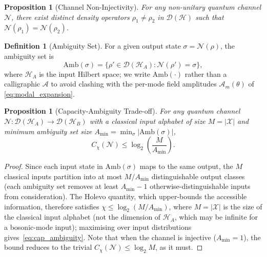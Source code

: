 \documentclass[journal,twocolumn]{IEEEtran}
\theoremstyle{definition}
\newtheorem{definition}{Definition}[section]
\theoremstyle{plain}
\newtheorem{proposition}[theorem]{Proposition}
\newcommand{\calH}{\mathcal{H}}
\newcommand{\Amb}{\mathrm{Amb}}
\begin{document}
\begin{proposition}[Channel Non-Injectivity]
\label{thm:non_inject}
For any non-unitary quantum channel $\mathcal{N}$, there exist
distinct density operators $\rho_1 \ne \rho_2$ in
$\mathcal{D}(\calH)$ such that $\mathcal{N}(\rho_1) =
\mathcal{N}(\rho_2)$.
\end{proposition}

\begin{definition}[Ambiguity Set]
For a given output state $\sigma = \mathcal{N}(\rho)$, the ambiguity
set is
\begin{equation}
  \Amb(\sigma) = \bigl\{\rho' \in \mathcal{D}(\calH_A)
    : \mathcal{N}(\rho') = \sigma\bigr\},
  \label{eq:ambiguity_set}
\end{equation}
where $\calH_A$ is the input Hilbert space; we write $\Amb(\cdot)$
rather than a calligraphic $\mathcal{A}$ to avoid clashing with the
per-mode field amplitudes $\mathcal{A}_m(\theta)$ of
\eqref{eq:modal_expansion}.
\end{definition}

\begin{proposition}[Capacity-Ambiguity Trade-off]
\label{thm:cap_ambiguity}
For any quantum channel $\mathcal{N}: \mathcal{D}(\calH_A) \to
\mathcal{D}(\calH_B)$ with a classical input alphabet of size $M =
|\mathcal{X}|$ and minimum ambiguity set
size $A_{\min} = \min_\sigma |\Amb(\sigma)|$,
\begin{equation}
  C_\chi(\mathcal{N}) \le \log_2\!\left(\frac{M}{A_{\min}}\right).
  \label{eq:cap_ambiguity}
\end{equation}
\end{proposition}

\begin{proof}
Since each input state in $\Amb(\sigma)$ maps to the same
output, the $M$ classical inputs partition into at most $M/A_{\min}$
distinguishable output classes (each ambiguity set removes at least
$A_{\min}-1$ otherwise-distinguishable inputs from consideration).
The Holevo quantity, which upper-bounds the accessible information,
therefore satisfies $\chi \le \log_2(M/A_{\min})$, where $M =
|\mathcal{X}|$ is the size of the classical input alphabet (not the
dimension of $\calH_A$, which may be infinite for a bosonic-mode
input); maximising over input distributions
gives~\eqref{eq:cap_ambiguity}. Note that when the channel is
injective ($A_{\min}=1$), the bound reduces to the trivial
$C_\chi(\mathcal{N}) \le \log_2 M$, as it must.
\end{proof}
\end{document}
